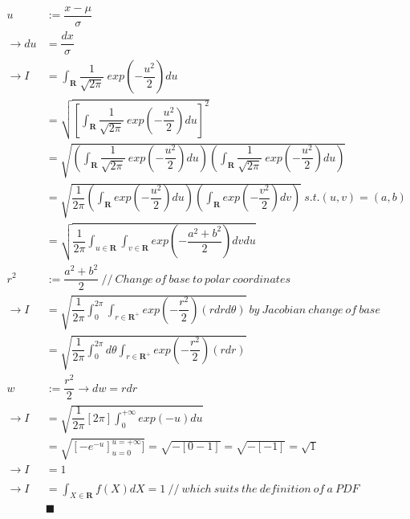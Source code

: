 \documentclass[]{article}
\begin{document}
			\begin{align*}
				u &:= \dfrac{x-\mu}{\sigma} \\
				\to du &= \dfrac{dx}{\sigma} \\
				\to I &=\int_\mathbf{R} \dfrac{1}{\sqrt{2\pi}}\ exp(-\dfrac{u^2}{2})du \\
				&= \sqrt{[\int_\mathbf{R} \dfrac{1}{\sqrt{2\pi}}\ exp(-\dfrac{u^2}{2})du]^2} \\
				&= \sqrt{(\int_\mathbf{R} \dfrac{1}{\sqrt{2\pi}}\ exp(-\dfrac{u^2}{2})du)(\int_\mathbf{R} \dfrac{1}{\sqrt{2\pi}}\ exp(-\dfrac{u^2}{2})du)} \\
				&= \sqrt{\dfrac{1}{2\pi}(\int_\mathbf{R}exp(-\dfrac{u^2}{2})du)(\int_\mathbf{R}exp(-\dfrac{v^2}{2})dv)}\ s.t. (u,v)=(a,b) \\
				&= \sqrt{\dfrac{1}{2\pi}\int_{u\in\mathbf{R}}\int_{v\in\mathbf{R}}exp(-\dfrac{a^2+b^2}{2})dvdu} \\
				r^2 &:= \dfrac{a^2+b^2}{2}\ //\ Change\ of\ base\ to\ polar\ coordinates  \\
				\to I &= \sqrt{\dfrac{1}{2\pi}\int_0^{2\pi}\int_{r\in\mathbf{R}^+}exp(-\dfrac{r^2}{2})(rdrd\theta)}\ by\ Jacobian\ change\ of\ base \\
				&= \sqrt{\dfrac{1}{2\pi}\int_0^{2\pi}d\theta \int_{r\in\mathbf{R}^+}exp(-\dfrac{r^2}{2})(rdr)} \\
				w &:= \dfrac{r^2}{2} \to dw = rdr \\
				\to I &= \sqrt{\dfrac{1}{2\pi}[2\pi]\int_0^{+\infty} exp(-u)du} \\
				&= \sqrt{[-e^{-u}]_{u=0}^{u=+\infty}]}
				= \sqrt{-[0 - 1]} = \sqrt{-[-1]} = \sqrt{1} \\
				\to I &= 1 \\\\
				\to I &= \int_{X\in\mathbf{R}}f(X)dX = 1\ //\ which\ suits\ the\ definition\ of\ a\ PDF \\
				&\blacksquare
			\end{align*}
			
\end{document}
